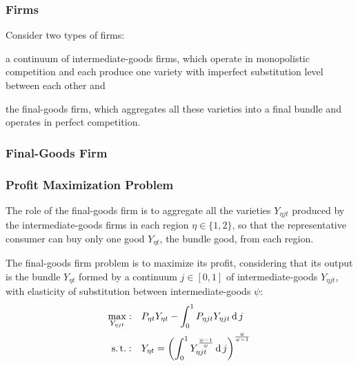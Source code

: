 \documentclass[../thesis.tex]{subfiles}
\begin{document}
\subsubsection*{Firms}

Consider two types of firms: 
\begin{enumerate*}[label=(\arabic*)]
	\item a continuum of intermediate-goods firms, which operate in monopolistic competition and each produce one variety with imperfect substitution level between each other and
	\item the final-goods firm, which aggregates all these varieties into a final bundle and operates in perfect competition.
\end{enumerate*}


\subsubsection{Final-Goods Firm}

\subsubsection*{Profit Maximization Problem}

The role of the final-goods firm is to aggregate all the varieties $Y_{\eta jt}$ produced by the intermediate-goods firms in each region $\eta \in \{1,2\}$, so that the representative consumer can buy only one good $Y_{\eta t}$, the bundle good, from each region.



The final-goods firm problem is to maximize its profit, considering that its output is the bundle $Y_{\eta t}$ formed by a continuum $j \in [0,1]$ of intermediate-goods $Y_{\eta jt}$, with elasticity of substitution between intermediate-goods $\psi$:
\begin{align}
	\max_{Y_{\eta jt}}: &\quad P_{\eta t} Y_{\eta t} - \int_{0}^{1} P_{\eta jt} Y_{\eta jt} \operatorname{d} j \label{eq_v2:reg-final-goods-firm-max-problem} \\
	\operatorname{s.t.}: & \quad Y_{\eta t} = \left( \int_{0}^{1} Y_{\eta jt}^{\frac{\psi-1}{\psi}} \operatorname{d} j \right)^{\frac{\psi}{\psi-1}} \label{eq_v2:reg-final-goods-firm-bundle-rule}
\end{align}
\end{document}
